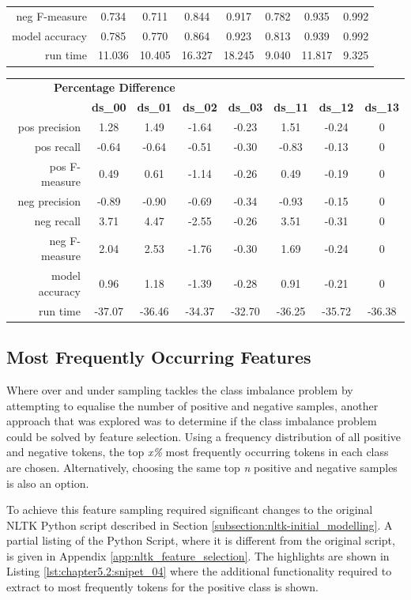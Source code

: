 \begin{table}[h]
\begin{tabular}{rccccccc}
	neg F-measure & 0.734 & 0.711 & 0.844 & 0.917 & 0.782 & 0.935 & 0.992 \\
	model accuracy & 0.785 & 0.770 & 0.864 & 0.923 & 0.813 & 0.939 & 0.992 \\
	run time & 11.036 & 10.405 & 16.327 & 18.245 & 9.040 & 11.817 & 9.325 \\
	\bottomrule
\end{tabular}
\begin{tabular}{rccccccc}
	\multicolumn{4}{c}{\textbf{Percentage Difference}} \\
	\cmidrule(r){1-4}
     & \textbf{ds\_00}  & \textbf{ds\_01} & \textbf{ds\_02} & \textbf{ds\_03} & \textbf{ds\_11} & \textbf{ds\_12} & \textbf{ds\_13}   \\
	\midrule
	pos precision & 1.28 & 1.49 & -1.64 & -0.23 & 1.51 & -0.24 & 0 \\
	pos recall & -0.64 & -0.64 & -0.51 & -0.30 & -0.83 & -0.13 & 0 \\
	pos F-measure & 0.49 & 0.61 & -1.14 & -0.26 & 0.49 & -0.19 & 0 \\
	neg precision & -0.89 & -0.90 & -0.69 & -0.34 & -0.93 & -0.15 & 0 \\
	neg recall & 3.71 & 4.47 & -2.55 & -0.26 & 3.51 & -0.31 & 0 \\
	neg F-measure & 2.04 & 2.53 & -1.76 & -0.30 & 1.69 & -0.24 & 0 \\
	model accuracy & 0.96 & 1.18 & -1.39 & -0.28 & 0.91 & -0.21 & 0 \\
	run time & -37.07 & -36.46 & -34.37 & -32.70 & -36.25 & -35.72 & -36.38 \\
	\bottomrule
\end{tabular}
\end{table}

\subsection{Most Frequently Occurring Features}
Where over and under sampling tackles the class imbalance problem by attempting to equalise the number of positive and negative samples, another approach that was explored was to determine if the class imbalance problem could be solved by feature selection. Using a frequency distribution of all positive and negative tokens, the top \textit{x\%} most frequently occurring tokens in each class are chosen. Alternatively, choosing the same top \textit{n} positive and negative samples is also an option.

To achieve this feature sampling required significant changes to the original NLTK Python script described in Section \ref{subsection:nltk-initial_modelling}. A partial listing of the Python Script, where it is different from the original script, is given in Appendix \ref{app:nltk_feature_selection}. The highlights are shown in Listing \ref{lst:chapter5.2:snipet_04} where the additional functionality required to extract to most frequently tokens for the positive class is shown.

